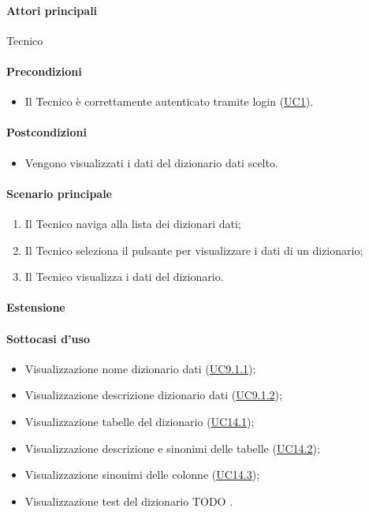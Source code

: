 \paragraph*{Attori principali} Tecnico

\paragraph*{Precondizioni}
\begin{itemize}
  \item Il Tecnico è correttamente autenticato tramite login (\hyperref[UC1]{UC1}).
\end{itemize}

\paragraph*{Postcondizioni}
\begin{itemize}
  \item Vengono visualizzati i dati del dizionario dati scelto.
\end{itemize}

\paragraph*{Scenario principale}
\begin{enumerate}
  \item Il Tecnico naviga alla lista dei dizionari dati;
  \item Il Tecnico seleziona il pulsante per visualizzare i dati di un dizionario;
  \item Il Tecnico visualizza i dati del dizionario.
\end{enumerate}

\paragraph*{Estensione}

\paragraph*{Sottocasi d'uso}
\begin{itemize}
  \item Visualizzazione nome dizionario dati (\hyperref[UC9point1point1]{UC9.1.1});
  \item Visualizzazione descrizione dizionario dati (\hyperref[UC9point1point2]{UC9.1.2});
  \item Visualizzazione tabelle del dizionario (\hyperref[UC14point1]{UC14.1});
  \item Visualizzazione descrizione e sinonimi delle tabelle (\hyperref[UC14point2]{UC14.2});
  \item Visualizzazione sinonimi delle colonne (\hyperref[UC14point3]{UC14.3});
  \item Visualizzazione test del dizionario TODO .  
\end{itemize}


